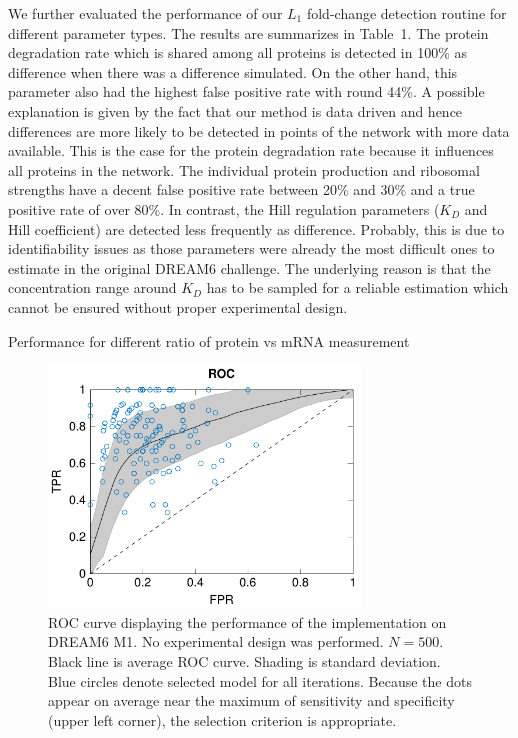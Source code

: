 \documentclass{bioinfo}
\begin{document}
We further evaluated the performance of our $L_1$ fold-change detection routine for different parameter types.
The results are summarizes in Table~1\vphantom{\ref{Tab:01}}.
The protein degradation rate which is shared among all proteins is detected in 100\% as difference when there was a difference simulated.
On the other hand, this parameter also had the highest false positive rate with round 44\%.
A possible explanation is given by the fact that our method is data driven and hence differences are more likely to be detected in points of the network with more data available.
This is the case for the protein degradation rate because it influences all proteins in the network.
The individual protein production and ribosomal strengths have a decent false positive rate between 20\% and 30\% and a true positive rate of over 80\%.
In contrast, the Hill regulation parameters ($K_D$ and Hill coefficient) are detected less frequently as difference.
Probably, this is due to identifiability issues as those parameters were already the most difficult ones to estimate in the original DREAM6 challenge.
The underlying reason is that the concentration range around $K_D$ has to be sampled for a reliable estimation which cannot be ensured without proper experimental design.

Performance for different ratio of protein vs mRNA measurement

\begin{figure}[!tpb]%
\centerline{\includegraphics[width=235pt]{Figures/ROC.pdf}}
\caption{ROC curve displaying the performance of the implementation on DREAM6 M1. No experimental design was performed. $N = 500$. Black line is average ROC curve. Shading is standard deviation. Blue circles denote selected model for all iterations. Because the dots appear on average near the maximum of sensitivity and specificity (upper left corner), the selection criterion is appropriate.}\label{fig:05}
\end{figure}
\end{document}
